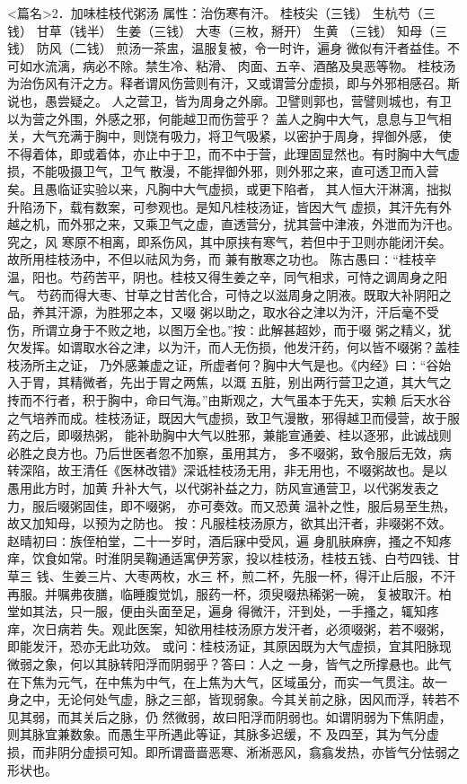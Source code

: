 \documentclass[a4paper,12pt,UTF8,twoside]{ctexbook}
\begin{document}
<篇名>2．加味桂枝代粥汤
属性：治伤寒有汗。 
桂枝尖（三钱） 生杭芍（三钱） 甘草（钱半） 生姜（三钱） 大枣（三枚，掰开） 生黄 （三钱） 
知母（三钱） 防风（二钱） 
煎汤一茶盅，温服复被，令一时许，遍身 微似有汗者益佳。不可如水流漓，病必不除。禁生冷、粘滑、 
肉面、五辛、酒酪及臭恶等物。 
桂枝汤为治伤风有汗之方。释者谓风伤营则有汗，又或谓营分虚损，即与外邪相感召。斯说也，愚尝疑之。 
人之营卫，皆为周身之外廓。卫譬则郭也，营譬则城也，有卫以为营之外围，外感之邪，何能越卫而伤营乎？ 
盖人之胸中大气，息息与卫气相关，大气充满于胸中，则饶有吸力，将卫气吸紧，以密护于周身，捍御外感， 
使不得着体，即或着体，亦止中于卫，而不中于营，此理固显然也。有时胸中大气虚损，不能吸摄卫气，卫气 
散漫，不能捍御外邪，则外邪之来，直可透卫而入营矣。且愚临证实验以来，凡胸中大气虚损，或更下陷者， 
其人恒大汗淋漓，拙拟升陷汤下，载有数案，可参观也。是知凡桂枝汤证，皆因大气 
虚损，其汗先有外越之机，而外邪之来，又乘卫气之虚，直透营分，扰其营中津液，外泄而为汗也。究之，风 
寒原不相离，即系伤风，其中原挟有寒气，若但中于卫则亦能闭汗矣。故所用桂枝汤中，不但以祛风为务，而 
兼有散寒之功也。 
陈古愚曰∶“桂枝辛温，阳也。芍药苦平，阴也。桂枝又得生姜之辛，同气相求，可恃之调周身之阳气。 
芍药而得大枣、甘草之甘苦化合，可恃之以滋周身之阴液。既取大补阴阳之品，养其汗源，为胜邪之本，又啜 
粥以助之，取水谷之津以为汗，汗后毫不受伤，所谓立身于不败之地，以图万全也。”按∶此解甚超妙，而于啜 
粥之精义，犹欠发挥。如谓取水谷之津，以为汗，而人无伤损，他发汗药，何以皆不啜粥？盖桂枝汤所主之证， 
乃外感兼虚之证，所虚者何？胸中大气是也。《内经》曰∶“谷始入于胃，其精微者，先出于胃之两焦，以溉 
五脏，别出两行营卫之道，其大气之抟而不行者，积于胸中，命曰气海。”由斯观之，大气虽本于先天，实赖 
后天水谷之气培养而成。桂枝汤证，既因大气虚损，致卫气漫散，邪得越卫而侵营，故于服药之后，即啜热粥， 
能补助胸中大气以胜邪，兼能宣通姜、桂以逐邪，此诚战则必胜之良方也。乃后世医者忽不加察，虽用其方， 
多不啜粥，致令服后无效，病转深陷，故王清任《医林改错》深诋桂枝汤无用，非无用也，不啜粥故也。是以 
愚用此方时，加黄 升补大气，以代粥补益之力，防风宣通营卫，以代粥发表之力，服后啜粥固佳，即不啜粥， 
亦可奏效。而又恐黄 温补之性，服后易至生热，故又加知母，以预为之防也。 
按∶凡服桂枝汤原方，欲其出汗者，非啜粥不效。赵晴初曰∶族侄柏堂，二十一岁时，酒后寐中受风，遍 
身肌肤麻痹，搔之不知疼痒，饮食如常。时淮阴吴鞠通适寓伊芳家，投以桂枝汤，桂枝五钱、白芍四钱、甘草三 
钱、生姜三片、大枣两枚，水三 
杯，煎二杯，先服一杯，得汗止后服，不汗再服。并嘱弗夜膳，临睡腹觉饥，服药一杯，须臾啜热稀粥一碗， 
复被取汗。柏堂如其法，只一服，便由头面至足，遍身 得微汗，汗到处，一手搔之，辄知疼痒，次日病若 
失。观此医案，知欲用桂枝汤原方发汗者，必须啜粥，若不啜粥，即能发汗，恐亦无此功效。 
或问∶桂枝汤证，其原因既为大气虚损，宜其阳脉现微弱之象，何以其脉转阳浮而阴弱乎？答曰∶人之 
一身，皆气之所撑悬也。此气在下焦为元气，在中焦为中气，在上焦为大气，区域虽分，而实一气贯注。故一 
身之中，无论何处气虚，脉之三部，皆现弱象。今其关前之脉，因风而浮，转若不见其弱，而其关后之脉，仍 
然微弱，故曰阳浮而阴弱也。如谓阴弱为下焦阴虚，则其脉宜兼数象。而愚生平所遇此等证，其脉多迟缓，不 
及四至，其为气分虚损，而非阴分虚损可知。即所谓啬啬恶寒、淅淅恶风，翕翕发热，亦皆气分怯弱之形状也。 
\end{document}

